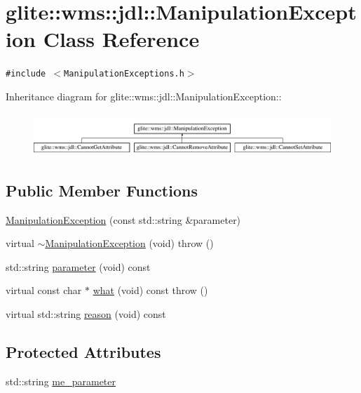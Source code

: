 \hypertarget{classglite_1_1wms_1_1jdl_1_1ManipulationException}{
\section{glite::wms::jdl::Manipulation\-Exception Class Reference}
\label{classglite_1_1wms_1_1jdl_1_1ManipulationException}
}
{\tt \#include $<$Manipulation\-Exceptions.h$>$}

Inheritance diagram for glite::wms::jdl::Manipulation\-Exception::\begin{figure}[H]
\begin{center}
\leavevmode
\includegraphics[height=1.62319cm]{classglite_1_1wms_1_1jdl_1_1ManipulationException}
\end{center}
\end{figure}
\subsection*{Public Member Functions}
\begin{CompactItemize}
\item 
\hyperlink{classglite_1_1wms_1_1jdl_1_1ManipulationException_a0}{Manipulation\-Exception} (const std::string \&parameter)
\item 
virtual \hyperlink{classglite_1_1wms_1_1jdl_1_1ManipulationException_a1}{$\sim$Manipulation\-Exception} (void)  throw ()
\item 
std::string \hyperlink{classglite_1_1wms_1_1jdl_1_1ManipulationException_a2}{parameter} (void) const 
\item 
virtual const char $\ast$ \hyperlink{classglite_1_1wms_1_1jdl_1_1ManipulationException_a3}{what} (void) const   throw ()
\item 
virtual std::string \hyperlink{classglite_1_1wms_1_1jdl_1_1ManipulationException_a4}{reason} (void) const 
\end{CompactItemize}
\subsection*{Protected Attributes}
\begin{CompactItemize}
\item 
std::string \hyperlink{classglite_1_1wms_1_1jdl_1_1ManipulationException_p0}{me\_\-parameter}
\end{CompactItemize}



